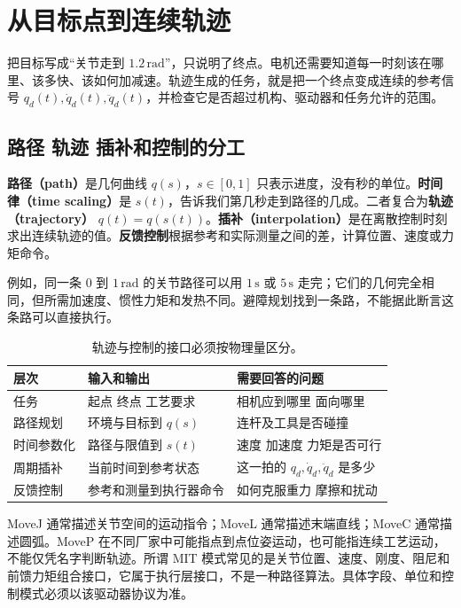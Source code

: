 \chapter{从目标点到连续轨迹}
\label{ch:trajectory}

把目标写成“关节走到 $1.2\,\mathrm{rad}$”，只说明了终点。电机还需要知道每一时刻该在哪里、该多快、该如何加减速。轨迹生成的任务，就是把一个终点变成连续的参考信号 $q_d(t),\dot q_d(t),\ddot q_d(t)$，并检查它是否超过机构、驱动器和任务允许的范围。

\section{路径 轨迹 插补和控制的分工}

\textbf{路径（path）}是几何曲线 $q(s)$，$s\in[0,1]$ 只表示进度，没有秒的单位。\textbf{时间律（time scaling）}是 $s(t)$，告诉我们第几秒走到路径的几成。二者复合为\textbf{轨迹（trajectory）} $q(t)=q(s(t))$。\textbf{插补（interpolation）}是在离散控制时刻求出连续轨迹的值。\textbf{反馈控制}根据参考和实际测量之间的差，计算位置、速度或力矩命令。

例如，同一条 $0$ 到 $1\,\mathrm{rad}$ 的关节路径可以用 $1\,\mathrm{s}$ 或 $5\,\mathrm{s}$ 走完；它们的几何完全相同，但所需加速度、惯性力矩和发热不同。避障规划找到一条路，不能据此断言这条路可以直接执行。

\begin{table}[htbp]\centering\small
\begin{tabularx}{\linewidth}{p{25mm}XX}\toprule
层次 & 输入和输出 & 需要回答的问题\\\midrule
任务 & 起点 终点 工艺要求 & 相机应到哪里 面向哪里\\
路径规划 & 环境与目标到 $q(s)$ & 连杆及工具是否碰撞\\
时间参数化 & 路径与限值到 $s(t)$ & 速度 加速度 力矩是否可行\\
周期插补 & 当前时间到参考状态 & 这一拍的 $q_d,\dot q_d,\ddot q_d$ 是多少\\
反馈控制 & 参考和测量到执行器命令 & 如何克服重力 摩擦和扰动\\\bottomrule
\end{tabularx}
\caption{轨迹与控制的接口必须按物理量区分。}
\end{table}

MoveJ 通常描述关节空间的运动指令；MoveL 通常描述末端直线；MoveC 通常描述圆弧。MoveP 在不同厂家中可能指点到点位姿运动，也可能指连续工艺运动，不能仅凭名字判断轨迹。所谓 MIT 模式常见的是关节位置、速度、刚度、阻尼和前馈力矩组合接口，它属于执行层接口，不是一种路径算法。具体字段、单位和控制模式必须以该驱动器协议为准。

